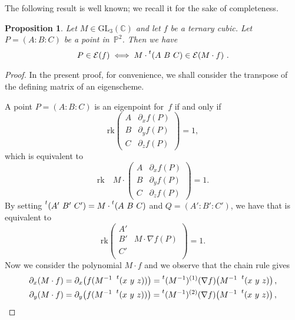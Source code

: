 \documentclass{amsart}
\theoremstyle{plain}
\newtheorem{prop}[lemma]{Proposition}
\theoremstyle{definition}
\newcommand{\C}{\mathbb{C}}
\newcommand{\p}{\mathbb{P}}
\newcommand{\de}{\partial}
\newcommand{\Eig}[1]{\mathcal{E}\!\left( {#1} \right)}
\newcommand{\rk}{\ensuremath{\mathrm{rk}}}
\begin{document}
The following result is well known; we recall it for the sake of completeness.

\begin{prop}
 Let $M \in \mathrm{GL}_3(\C)$ and let $f$ be a ternary cubic.
 Let $P = (A: B: C)$ be a point in~$\p^2$.
 Then we have
 \[
  P \in \Eig{f} \iff M \cdot \prescript{t} {}(A \ B \ C) \in \Eig{M \cdot f} \,.
 \]
\end{prop}
\begin{proof}
In the present proof,
for convenience, we shall consider the transpose of the defining matrix of an eigenscheme.

A point $P = (A: B: C)$ is an eigenpoint for~$f$ if and only if
\begin{equation*}
  \mathrm{rk}  \begin{pmatrix}
    A & \de_x f(P) \\
    B & \de_y f(P)  \\
    C & \de_z f(P)
    \end{pmatrix}=1,
\end{equation*}
which is equivalent to
\begin{equation}
\label{eq:def_matrix_M}
    \mathrm{rk} \quad M \cdot \begin{pmatrix}
    A & \de_x f(P) \\
    B & \de_y f(P)  \\
    C & \de_z f(P)
    \end{pmatrix}
    =1.
\end{equation}
By setting $\prescript{t} {}(A' \ B' \ C' )= M \cdot \prescript{t} {}(A \ B \ C) $ and $Q=(A':B':C')$, we have that 
is equivalent to
%
\begin{equation}
\label{eq:transformed}
  \rk
  \begin{pmatrix}
    A' & \\
    B' & M \cdot \nabla f (P) \\
    C' & \\
  \end{pmatrix}=1.
\end{equation}
%
Now we consider the polynomial $M \cdot f$ and we observe that the chain rule gives
%
\begin{gather*}
\partial_x (M\cdot f) = \partial_x \bigl( f(M^{-1} \ \prescript{t} {} (x \ y \ z)) \bigr) = \prescript{t} {}(M^{-1})^{(1)}(\nabla f) \bigl( M^{-1}\  \prescript{t} {} (x \ y \ z) \bigr) \,, \\
\partial_y (M\cdot f) = \partial_y \bigl( f(M^{-1} \ \prescript{t} {} (x \ y \ z)) \bigr) = \prescript{t} {}(M^{-1})^{(2)}(\nabla f) \bigl( M^{-1}\  \prescript{t} {} (x \ y \ z) \bigr) \,, \\

\end{gather*}
\end{proof}
\end{document}
